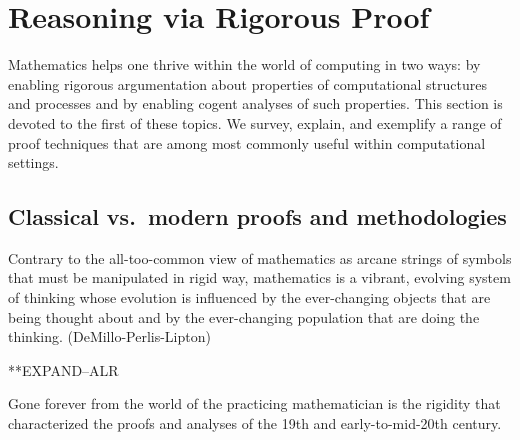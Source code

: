 \section{Reasoning via Rigorous Proof}
\label{sec:reasoning-via-proofs}

Mathematics helps one thrive within the world of computing in two
ways: by enabling rigorous argumentation about properties of
computational structures and processes and by enabling cogent analyses
of such properties.  This section is devoted to the first of these
topics.  We survey, explain, and exemplify a range of proof techniques
that are among most commonly useful within computational settings.

\subsection{Classical vs.~modern proofs and methodologies}
\label{sec:classical-v-modern-proofs}

Contrary to the all-too-common view of mathematics as arcane strings
of symbols that must be manipulated in rigid way, mathematics is a
vibrant, evolving system of thinking whose evolution is influenced by
the ever-changing objects that are being thought about and by the
ever-changing population that are doing the thinking.
(DeMillo-Perlis-Lipton)

**EXPAND--ALR

Gone forever from the world of the practicing mathematician is the
rigidity that characterized the proofs and analyses of the 19th and
early-to-mid-20th century.
\bigskip

\noindent {}
\bigskip

